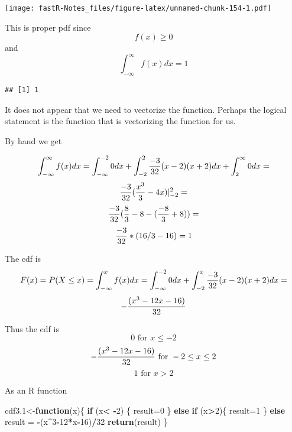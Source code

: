 \documentclass[]{book}
\newenvironment{Shaded}{\begin{snugshade}}{\end{snugshade}}
\newcommand{\KeywordTok}[1]{\textcolor[rgb]{0.13,0.29,0.53}{\textbf{#1}}}
\newcommand{\DecValTok}[1]{\textcolor[rgb]{0.00,0.00,0.81}{#1}}
\newcommand{\StringTok}[1]{\textcolor[rgb]{0.31,0.60,0.02}{#1}}
\newcommand{\OtherTok}[1]{\textcolor[rgb]{0.56,0.35,0.01}{#1}}
\newcommand{\ControlFlowTok}[1]{\textcolor[rgb]{0.13,0.29,0.53}{\textbf{#1}}}
\newcommand{\OperatorTok}[1]{\textcolor[rgb]{0.81,0.36,0.00}{\textbf{#1}}}
\newcommand{\NormalTok}[1]{#1}
\theoremstyle{definition}
\theoremstyle{definition}
\theoremstyle{definition}
\theoremstyle{remark}
\begin{document}
\texttt{[image: fastR-Notes\_files/figure-latex/unnamed-chunk-154-1.pdf]}

This is proper pdf since \[f(x) \geq 0\] and
\[\int_{-\infty}^{\infty}f(x)dx=1\]

\begin{Shaded}
\end{Shaded}

\begin{verbatim}
## [1] 1
\end{verbatim}

It does not appear that we need to vectorize the function. Perhaps the
logical statement is the function that is vectorizing the function for
us.

By hand we get

\[\int_{-\infty}^{\infty}f(x)dx=\int_{-\infty}^{-2}0dx+\int_{-2}^{2}{-3 \over 32}(x-2)(x+2)dx+\int_{2}^{\infty}0dx=\]
\[{-3 \over 32}({x^3 \over 3} -4x) \vert_{-2}^{2}=\]
\[{-3 \over 32}({8 \over 3}-8 -({-8 \over 3} +8) )=\]
\[{-3 \over 32}*(16/3-16)=1\]

The cdf is
\[F(x)=P(X\leq x)=\int_{-\infty}^{x}f(x)dx=\int_{-\infty}^{-2}0dx+\int_{-2}^{x}{-3 \over 32}(x-2)(x+2)dx=\]
\[-{(x^3-12x-16) \over 32}\]

Thus the cdf is \[0 \mbox{ for }x \leq -2\]
\[-{(x^3-12x-16) \over 32} \mbox{ for } -2 \leq x \leq 2\]
\[1 \mbox{ for } x>2\]

As an R function

\begin{Shaded}
\begin{Highlighting}[]
\NormalTok{cdf3.}\DecValTok{1}\NormalTok{<-}\ControlFlowTok{function}\NormalTok{(x)\{}
    \ControlFlowTok{if}\NormalTok{ (x}\OperatorTok{<}\StringTok{ }\OperatorTok{-}\DecValTok{2}\NormalTok{) \{}
\NormalTok{        result=}\DecValTok{0}
\NormalTok{    \} }\ControlFlowTok{else} \ControlFlowTok{if}\NormalTok{ (x}\OperatorTok{>}\DecValTok{2}\NormalTok{)\{}
\NormalTok{        result=}\DecValTok{1}
\NormalTok{    \} }\ControlFlowTok{else}\NormalTok{ result =}\StringTok{ }\OperatorTok{-}\NormalTok{(x}\OperatorTok{^}\DecValTok{3}\OperatorTok{-}\DecValTok{12}\OperatorTok{*}\NormalTok{x}\OperatorTok{-}\DecValTok{16}\NormalTok{)}\OperatorTok{/}\DecValTok{32}
\KeywordTok{return}\NormalTok{(result)}
\NormalTok{\}}
\end{Highlighting}
\end{Shaded}
\end{document}
